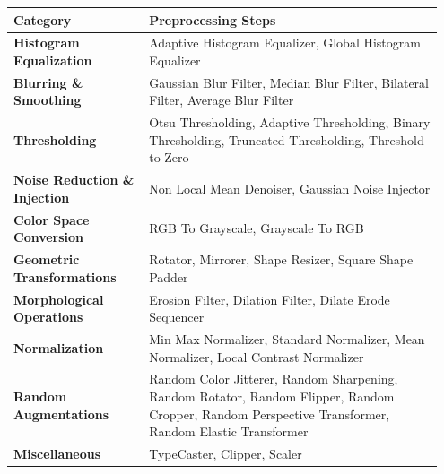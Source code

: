 \documentclass[journal]{new-aiaa}
\begin{document}
\begin{longtable}{|p{0.3\linewidth}|p{0.65\linewidth}|}
	\hline
	\textbf{Category}                     & \textbf{Preprocessing Steps}                                                                                                                         \\
	\hline
	\endhead
	\hline
	\endfoot

	\textbf{Histogram Equalization}       & Adaptive Histogram Equalizer, Global Histogram Equalizer                                                                                             \\
	\hline
	\textbf{Blurring \& Smoothing}        & Gaussian Blur Filter, Median Blur Filter, Bilateral Filter, Average Blur Filter                                                                      \\
	\hline
	\textbf{Thresholding}                 & Otsu Thresholding, Adaptive Thresholding, Binary Thresholding, Truncated Thresholding, Threshold to Zero                                             \\
	\hline
	\textbf{Noise Reduction \& Injection} & Non Local Mean Denoiser, Gaussian Noise Injector                                                                                                     \\
	\hline
	\textbf{Color Space Conversion}       & RGB To Grayscale, Grayscale To RGB                                                                                                                   \\
	\hline
	\textbf{Geometric Transformations}    & Rotator, Mirrorer, Shape Resizer, Square Shape Padder                                                                                                \\
	\hline
	\textbf{Morphological Operations}     & Erosion Filter, Dilation Filter, Dilate Erode Sequencer                                                                                              \\
	\hline
	\textbf{Normalization}                & Min Max Normalizer, Standard Normalizer, Mean Normalizer, Local Contrast Normalizer                                                                  \\
	\hline
	\textbf{Random Augmentations}         & Random Color Jitterer, Random Sharpening, Random Rotator, Random Flipper, Random Cropper, Random Perspective Transformer, Random Elastic Transformer \\
	\textbf{Miscellaneous}                & TypeCaster, Clipper, Scaler                                                                                                                          \\
	\hline
\end{longtable}
\end{document}
